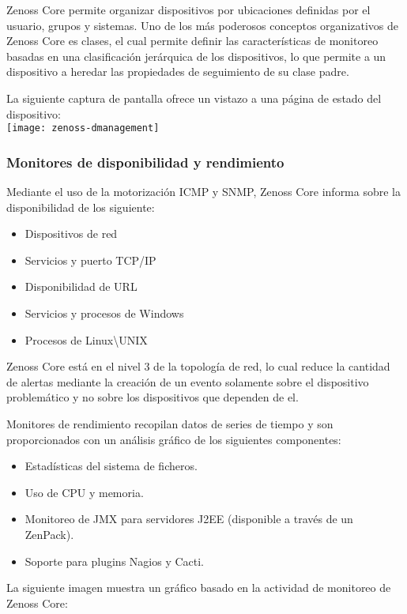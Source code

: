 Zenoss Core permite organizar dispositivos por ubicaciones definidas
por el usuario, grupos y sistemas. Uno de los más poderosos
conceptos organizativos de Zenoss Core es clases, el cual permite
definir las características de monitoreo basadas en una
clasificación jerárquica de los dispositivos, lo que permite a un
dispositivo a heredar las propiedades de seguimiento de su clase padre.

La siguiente captura de pantalla ofrece un vistazo a una página de
estado del dispositivo: \\

\texttt{[image: zenoss-dmanagement]}

\subsubsection{Monitores de disponibilidad y rendimiento}

Mediante el uso de la motorización ICMP y SNMP, Zenoss Core informa
sobre la disponibilidad de los siguiente:

\begin{itemize}
\item Dispositivos de red
\item Servicios y puerto TCP/IP
\item Disponibilidad de URL
\item Servicios y procesos de Windows
\item Procesos de Linux\textbackslash{}UNIX
\end{itemize}

Zenoss Core está en el nivel 3 de la topología de red, lo cual
reduce la cantidad de alertas mediante la creación de un evento
solamente sobre el dispositivo problemático y no sobre los dispositivos
que dependen de el.

Monitores de rendimiento recopilan datos de series de tiempo y son
proporcionados con un análisis gráfico de los siguientes
componentes:

\begin{itemize}
\item Estadísticas del sistema de ficheros.
\item Uso de CPU y memoria.
\item Monitoreo de JMX para servidores J2EE (disponible a través de
  un ZenPack).
\item Soporte para plugins Nagios y Cacti.
\end{itemize}

La siguiente imagen muestra un gráfico basado en la
actividad de monitoreo de Zenoss Core: \\

